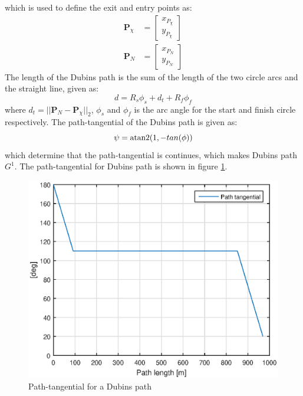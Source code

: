 which is used to define the exit and entry points as:
\begin{subequations}
\begin{align}
\mathbf{P}_{\chi} &= \begin{bmatrix}
x_{P_\chi} \\
y_{P_\chi}
\end{bmatrix} \\
\mathbf{P}_N &= \begin{bmatrix}
x_{P_N} \\
y_{P_N}
\end{bmatrix}
\end{align}
\end{subequations}
The length of the Dubins path is the sum of the length of the two circle arcs and the straight line, given as:
\begin{equation}
d = R_s\phi_s + d_t + R_f\phi_f
\end{equation}
where $d_t = ||\mathbf{P}_N-\mathbf{P}_{\chi}||_2$, $\phi_s$ and $\phi_f$ is the arc angle for the start and finish circle respectively. The path-tangential of the Dubins path is given as:
\begin{equation}
\psi = \atan2(1,-tan(\phi))
\end{equation}
which determine that the path-tangential is continues, which makes Dubins path $G^1$. The path-tangential for Dubins path is shown in figure \ref{Fig:Path-tangentialDubin}.
\begin{figure}[H]
\centering
\includegraphics[scale=0.7]{figs/TheoryPlot/tangentialDubin.eps}
\caption{Path-tangential for a Dubins path}
\label{Fig:Path-tangentialDubin}
\end{figure}
\cleardoublepage
